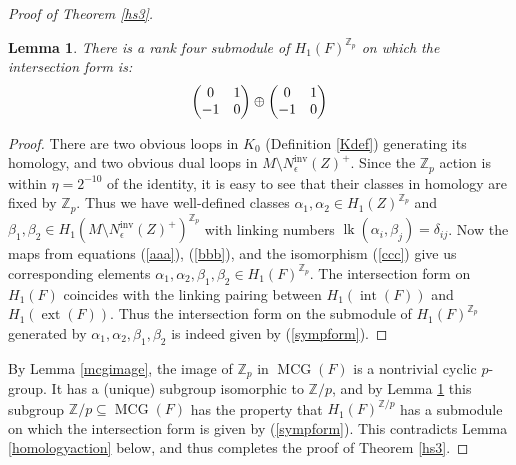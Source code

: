 \documentclass[12pt]{article}
\theoremstyle{plain}
\newtheorem{lemma}[theorem]{Lemma}
\theoremstyle{definition}
\theoremstyle{remark}
\numberwithin{equation}{section}
\begin{document}
\begin{proof}[Proof of Theorem \ref{hs3}]
\begin{lemma}\label{fixedhaslargeform}
There is a rank four submodule of $H_1(F)^{\mathbb Z_p}$ on which the intersection form is:
\begin{equation}\label{sympform}
\left(\begin{matrix}0&1\cr-1&0\end{matrix}\right)\oplus\left(\begin{matrix}0&1\cr-1&0\end{matrix}\right)
\end{equation}
\end{lemma}

\begin{proof}
There are two obvious loops in $K_0$ (Definition \ref{Kdef}) generating its homology, and two obvious dual loops in $M\setminus N^{\operatorname{inv}}_\epsilon(Z)^+$.  Since the $\mathbb Z_p$ action is within $\eta=2^{-10}$ of the identity, it is easy to see that their classes in homology are fixed by $\mathbb Z_p$.  Thus we have well-defined classes $\alpha_1,\alpha_2\in H_1(Z)^{\mathbb Z_p}$ and $\beta_1,\beta_2\in H_1(M\setminus N^{\operatorname{inv}}_\epsilon(Z)^+)^{\mathbb Z_p}$ with linking numbers $\operatorname{lk}(\alpha_i,\beta_j)=\delta_{ij}$.  Now the maps from equations (\ref{aaa}), (\ref{bbb}), and the isomorphism (\ref{ccc}) give us corresponding elements $\alpha_1,\alpha_2,\beta_1,\beta_2\in H_1(F)^{\mathbb Z_p}$.  The intersection form on $H_1(F)$ coincides with the linking pairing between $H_1(\operatorname{int}(F))$ and $H_1(\operatorname{ext}(F))$.  Thus the intersection form on the submodule of $H_1(F)^{\mathbb Z_p}$ generated by $\alpha_1,\alpha_2,\beta_1,\beta_2$ is indeed given by (\ref{sympform}).
\end{proof}

By Lemma \ref{mcgimage}, the image of $\mathbb Z_p$ in $\operatorname{MCG}(F)$ is a nontrivial cyclic $p$-group.  It has a (unique) subgroup isomorphic to $\mathbb Z/p$, and by Lemma \ref{fixedhaslargeform} this subgroup $\mathbb Z/p\subseteq\operatorname{MCG}(F)$ has the property that $H_1(F)^{\mathbb Z/p}$ has a submodule on which the intersection form is given by (\ref{sympform}).  This contradicts Lemma \ref{homologyaction} below, and thus completes the proof of Theorem \ref{hs3}.
\end{proof}
\end{document}
